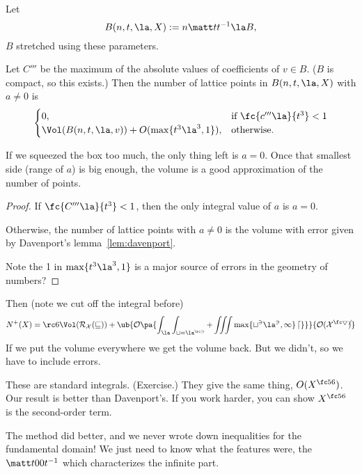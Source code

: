 Let 
\[
B(n,t,\la,X) := n\matt t{}{}t^{-1}\la B,
\]
$B$ stretched using these parameters.
\begin{lem}
Let $C'''$ be the maximum of the absolute values of coefficients of $v\in B$. ($B$ is compact, so this exists.) 
Then the number of lattice points in $B(n,t,\la,X)$ with $a\ne 0$ is
\[
\begin{cases}
0,&\text{if }\fc{c'''\la}{t^3}<1\\
\Vol(B(n,t,\la,v)) + O(\max\{t^3\la^3, 1\}),&\text{otherwise}.
\end{cases}
\]
\end{lem}
If we squeezed the box too much, the only thing left is $a=0$. Once that smallest side (range of $a$) is big enough, the volume is a good approximation of the number of points.
\begin{proof}
If $\fc{C'''\la}{t^3}<1$, then the only integral value of $a$ is $a=0$. 

Otherwise, the number of lattice points with $a\ne 0$ is the volume with error given by Davenport's lemma~\ref{lem:davenport}. %

Note the 1 in $\max\{t^3\la^3, 1\}$ is a major source of errors in the geometry of numbers?
\end{proof}

Then  (note we cut off the integral before)
\[
N^+(X) = \rc 6 \Vol(\cal R_X(v)) + \ub{O\pa{\int_\la \int_{t=\la^{\rc 3}}+\iiint \max\{t^3\la^3,1\}\,dg}}{O(X^{\fc 56})}
%
\]
If we put the volume everywhere we get the volume back. But we didn't, so we have to include errors. %

These are standard integrals. (Exercise.) They give the same thing, $O(X^{\fc 56})$.  Our result is better than Davenport's. If you work harder, you can show $X^{\fc 56}$ is the second-order term. %

The method did better, and we never wrote down inequalities for the fundamental domain! We just need to know what the features were, the $\matt t00{t^{-1}}$ which characterizes the infinite part. %

